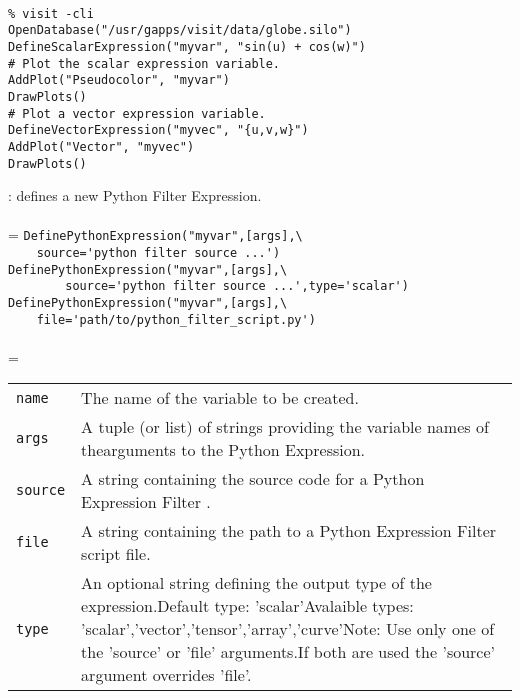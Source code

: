 \documentclass[10pt,a4paper]{report}
\begin{document}
\\[-6mm]
\begin{verbatim}% visit -cli
OpenDatabase("/usr/gapps/visit/data/globe.silo")
DefineScalarExpression("myvar", "sin(u) + cos(w)")
# Plot the scalar expression variable.
AddPlot("Pseudocolor", "myvar")
DrawPlots()
# Plot a vector expression variable.
DefineVectorExpression("myvec", "{u,v,w}")
AddPlot("Vector", "myvec")
DrawPlots()
\end{verbatim}
\newpage


{}
: defines a new Python Filter Expression.\\[-3mm]

 \\ 
\hangindent=\parindent
\verb!DefinePythonExpression("myvar",[args],\ ! \\ 
\verb!    source='python filter source ...')!\\
\verb!DefinePythonExpression("myvar",[args],\ ! \\ 
\verb!        source='python filter source ...',type='scalar')!\\
\verb!DefinePythonExpression("myvar",[args],\ ! \\ 
\verb!    file='path/to/python_filter_script.py')!\\ [-3mm]

 \\ 
\hangindent=\parindent 
\begin{tabular}{lp{9cm}}
\verb!name! & The name of the variable to be created. \\
\verb!args! & A tuple (or list) of strings providing the variable names of thearguments to the Python Expression. \\
\verb!source! & A string containing the source code for a Python Expression Filter . \\
\verb!file! & A string containing the path to a Python Expression Filter script file. \\
\verb!type! & An optional string defining the output type of the expression.Default type: 'scalar'Avalaible types: 'scalar','vector','tensor','array','curve'Note: Use only one of the 'source' or 'file' arguments.If both are used the 'source' argument overrides 'file'. \\
\end{tabular} \\[-2mm]
\end{document}
